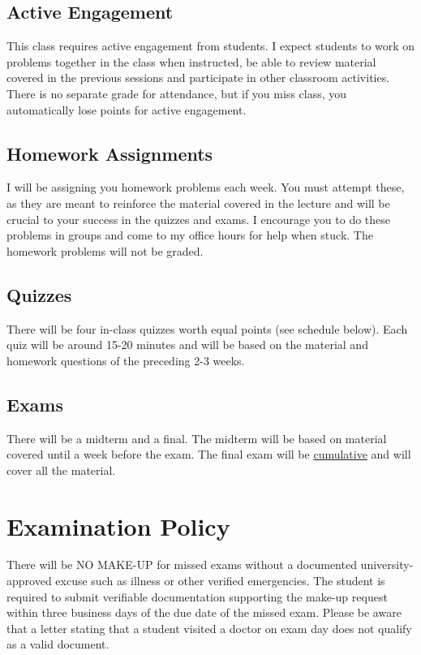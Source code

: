 \documentclass{./../Latex/syllabus}
\begin{document}
\subsection*{Active Engagement}
This class requires active engagement from students. I expect students to work on problems together in the class when instructed, be able to review material covered in the previous sessions and participate in other classroom activities. There is no separate grade for attendance, but if you miss class, you automatically lose points for active engagement.

\subsection*{Homework Assignments}
I will be assigning you homework problems each week. You must attempt these, as they are meant to reinforce the material covered in the lecture and will be crucial to your success in the quizzes and exams. I encourage you to do these problems in groups and come to my office hours for help when stuck. The homework problems will not be graded.

\subsection*{Quizzes}
There will be four in-class quizzes worth equal points (see schedule below). Each quiz will be around 15-20 minutes and will be based on the material and homework questions of the preceding 2-3 weeks. %

\subsection*{Exams}
There will be a midterm and a final. The midterm will be based on material covered until a week before the exam. The final exam will be \underline{cumulative} and will cover all the material. 

\section*{Examination Policy}
There will be NO MAKE-UP for missed exams without a documented university-approved excuse such as illness or other verified emergencies. The student is required to submit verifiable documentation supporting the make-up request within three business days of the due date of the missed exam. Please be aware that a letter stating that a student visited a doctor on exam day does not qualify as a valid document.
\end{document}
